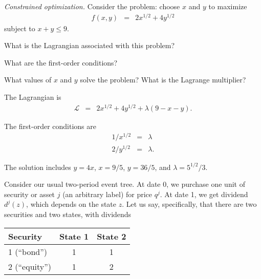 \documentclass[11pt]{exam}
\begin{document}
\begin{questions}
\item {\it Constrained optimization.\/}
Consider the problem:  choose $x$ and $y$ to maximize
\begin{eqnarray*}
    f(x,y) &=& 2 x^{1/2} + 4 y^{1/2}
\end{eqnarray*}
subject to $ x + y \leq 9$.
%
\begin{parts}
\item What is the Lagrangian associated with this problem?
\item What are the first-order conditions?
\item What values of $x$ and $y$ solve the problem?
What is the Lagrange multiplier?
\end{parts}
%
\begin{solution}
\begin{parts}
\item
The Lagrangian is
\begin{eqnarray*}
    \mathcal{L} &=& 2 x^{1/2} + 4 y^{1/2}   + \lambda (9 - x - y ).
\end{eqnarray*}
\item The first-order conditions are
\begin{eqnarray*}
    1/x^{1/2} &=& \lambda \\
    2/y^{1/2} &=& \lambda .
\end{eqnarray*}
\item The solution includes $ y = 4x$,  $x = 9/5$, $y = 36/5$, and $\lambda = {5}^{1/2}/3$.
\end{parts}
\end{solution}

Consider our usual two-period event tree.
At date 0, we purchase one unit of security or asset $j$ (an arbitrary label) for price $q^j$.
At date 1, we get dividend $d^j(z)$, which depends on the state $z$.
Let us say, specifically,
that there are two securities and two states, with dividends

\medskip
\begin{center}
\begin{tabular}{lcc}
\toprule
Security  &  State 1 & State 2 \\
\midrule
1 (``bond'')    &  1    &   1  \\
2 (``equity'')  &  1    &   2  \\
\bottomrule
\end{tabular}
\end{center}


\end{questions}
\end{document}
